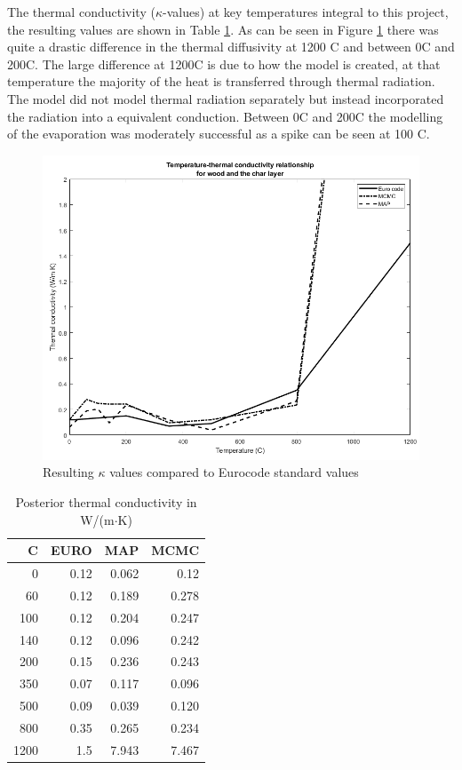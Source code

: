 The thermal conductivity ($\kappa$-values) at key temperatures integral to this project, the resulting values are shown in Table \ref{krestab}. 
As can be seen in Figure \ref{kresult_euro_fig} there was quite a drastic difference in the thermal diffusivity at 1200 \textdegree C and between 0\textdegree C and 200\textdegree C.
The large difference at 1200\textdegree C is due to how the model is created, at that temperature the majority of the heat is transferred through thermal radiation.
The model did not model thermal radiation separately but instead incorporated the radiation into a equivalent conduction.
Between 0\textdegree C and 200\textdegree C the modelling of the evaporation was moderately successful as a spike can be seen at 100 \textdegree C.  
\begin{figure}
\centering
	\label{kresult_euro_fig}
	\includegraphics[width=\textwidth]{figures/kvalues_all_NOshi.png}
	\caption{Resulting $\kappa$ values compared to Eurocode standard values}
\end{figure}
\begin{table} \label{krestab}
\centering
\caption{Posterior thermal conductivity in W/(m$\cdot$K)}
	\begin{tabular}{ r r r r }
	\toprule
	 \textdegree C & EURO & MAP & MCMC\\
	\midrule
	0   & 0.12&0.062 &0.12\\
	60  &0.12& 0.189 &0.278\\
	100 &0.12& 0.204 &0.247\\
 	140 &0.12& 0.096 &0.242\\
	200 & 0.15& 0.236 &0.243\\
	350 & 0.07& 0.117  &0.096\\
	500 & 0.09& 0.039 &0.120\\
	800 & 0.35& 0.265 &0.234\\
	1200& 1.5& 7.943 &7.467\\
	\bottomrule	
	\end{tabular}
	
\end{table}
 
